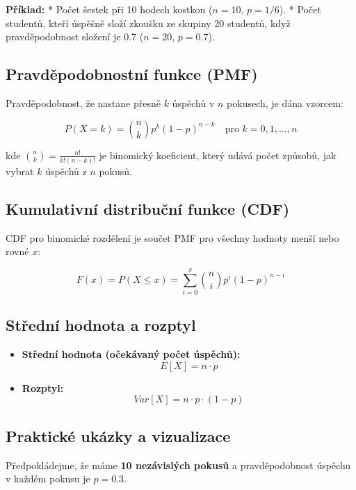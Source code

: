 \documentclass[
  czech,
  11pt,
  letterpaper,
  DIV=11,
  numbers=noendperiod]{scrreprt}
\providecommand{\tightlist}{%
  \setlength{\itemsep}{0pt}\setlength{\parskip}{0pt}}
\begin{document}
\textbf{Příklad:} * Počet šestek při 10 hodech kostkou (\(n=10\),
\(p=1/6\)). * Počet studentů, kteří úspěšně složí zkoušku ze skupiny 20
studentů, když pravděpodobnost složení je 0.7 (\(n=20\), \(p=0.7\)).

\subsection{Pravděpodobnostní funkce
(PMF)}\label{pravdux11bpodobnostnuxed-funkce-pmf-1}

Pravděpodobnost, že nastane přesně \(k\) úspěchů v \(n\) pokusech, je
dána vzorcem:

\[ P(X=k) = \binom{n}{k} p^k (1-p)^{n-k} \quad \text{pro } k=0, 1, \dots, n \]

kde \(\binom{n}{k} = \frac{n!}{k!(n-k)!}\) je binomický koeficient,
který udává počet způsobů, jak vybrat \(k\) úspěchů z \(n\) pokusů.

\subsection{Kumulativní distribuční funkce
(CDF)}\label{kumulativnuxed-distribuux10dnuxed-funkce-cdf-1}

CDF pro binomické rozdělení je součet PMF pro všechny hodnoty menší nebo
rovné \(x\):

\[ F(x) = P(X \le x) = \sum_{i=0}^{x} \binom{n}{i} p^i (1-p)^{n-i} \]

\subsection{Střední hodnota a
rozptyl}\label{stux159ednuxed-hodnota-a-rozptyl}

\begin{itemize}
\tightlist
\item
  \textbf{Střední hodnota (očekávaný počet úspěchů):}
  \[ E[X] = n \cdot p \]
\item
  \textbf{Rozptyl:} \[ Var[X] = n \cdot p \cdot (1-p) \]
\end{itemize}

\subsection{Praktické ukázky a
vizualizace}\label{praktickuxe9-ukuxe1zky-a-vizualizace}

Předpokládejme, že máme \textbf{10 nezávislých pokusů} a pravděpodobnost
úspěchu v každém pokusu je \textbf{\(p=0.3\)}.
\end{document}
